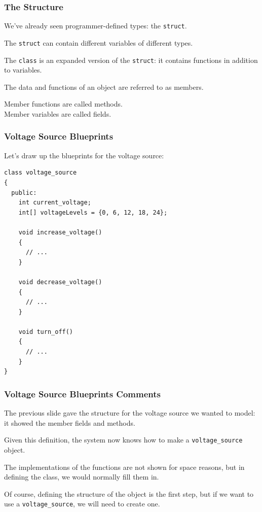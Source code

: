 \begin{frame}
\frametitle{The Structure}

We've already seen programmer-defined types: the \texttt{struct}.

The \texttt{struct} can contain different variables of different types.

The \texttt{class} is an expanded version of the \texttt{struct}: it contains functions in addition to variables.

The data and functions of an object are referred to as \alert{members}.

Member functions are called \alert{methods}.\\
Member variables are called \alert{fields}.

\end{frame}


\begin{frame}[fragile]
\frametitle{Voltage Source Blueprints}

Let's draw up the blueprints for the voltage source:
{\scriptsize
\begin{verbatim}
class voltage_source
{
  public: 
    int current_voltage;
    int[] voltageLevels = {0, 6, 12, 18, 24};

    void increase_voltage()
    {
      // ...
    }
  
    void decrease_voltage()
    {
      // ...
    }
  
    void turn_off()
    {
      // ...
    }
}
\end{verbatim}
}

\end{frame}

\begin{frame}
\frametitle{Voltage Source Blueprints Comments}

The previous slide gave the structure for the voltage source we wanted to model: it showed the member fields and methods.

Given this definition, the system now knows how to make a \texttt{voltage\_source} object.

The implementations of the functions are not shown for space reasons, but in defining the class, we would normally fill them in.

Of course, defining the structure of the object is the first step, but if we want to use a \texttt{voltage\_source}, we will need to create one.

\end{frame}


